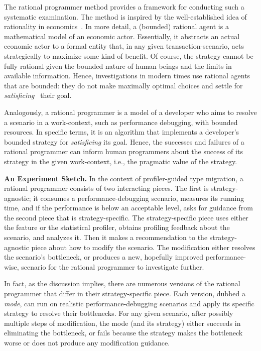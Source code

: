 The rational programmer method provides a framework for conducting such a
systematic examination. The method is inspired by the well-established idea of
rationality in economics~\cite{mill1874essays, henrich2001search}.  In more
detail, a (bounded) rational agent is a mathematical model of an economic
actor. Essentially, it abstracts an actual economic actor to a formal entity that, in
any given transaction-scenario, acts strategically to maximize some kind of
benefit.  Of course, the strategy cannot be fully rational given the bounded
nature of human beings and the limits in available information. Hence,
investigations in modern times use rational agents that are bounded: they do not
make maximally optimal choices and settle
for \emph{satisficing}~\cite{hs:satisfice} their goal.

Analogously, a rational programmer is a model of a developer who aims to resolve
a scenario in a work-context, such as performance debugging, with bounded resources. In
specific terms, it is an algorithm that implements a developer's bounded
strategy for \emph{satisficing} its goal.  Hence, the successes and failures of
a rational programmer can inform human programmers about the success of
its strategy in the given work-context, i.e., the pragmatic value of the
strategy.




\bigskip

\noindent\textbf{An Experiment Sketch.} In the context of profiler-guided
type migration, a rational programmer consists of two interacting pieces.
The first is strategy-agnostic; it consumes a performance-debugging
scenario, measures its running time, and if the performance is below an
acceptable level, asks for guidance from the second piece that is
strategy-specific. The strategy-specific piece uses either the feature or
the statistical profiler, obtains profiling feedback about the scenario,
and analyzes it. Then it makes a recommendation to the strategy-agnostic
piece about how to modify the scenario. The modification either resolves
the scenario's bottleneck, or produces a new, hopefully improved performance-wise,
scenario for the rational programmer to investigate further. 

In fact, as the discussion implies, there are numerous versions of  the
rational programmer that differ in their strategy-specific piece. Each
version, dubbed a \emph{mode}, can run on realistic performance-debugging
scenarios and apply its specific strategy to resolve their bottlenecks.
For any given scenario, after possibly multiple steps of modification, the
mode (and its strategy) either succeeds in eliminating the bottleneck, or
fails because the strategy makes the bottleneck worse or does not produce
any modification guidance. 

